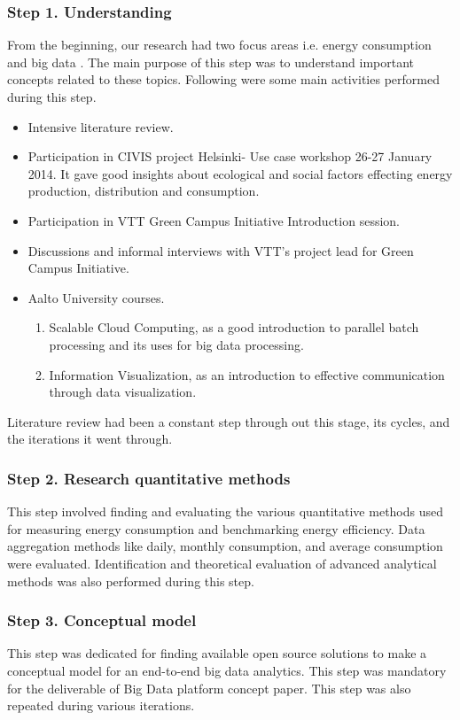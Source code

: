 \subsubsection{Step 1. Understanding} 
From the beginning, our research had two focus areas i.e. energy consumption and big data . The main purpose of this step was to understand important concepts related to these topics. Following were some main activities performed during this step.
\begin{itemize}
\item Intensive literature review.
\item Participation in CIVIS project Helsinki- Use case workshop 26-27 January 2014. It gave good insights about ecological and social factors effecting energy production, distribution and consumption.
\item Participation in VTT Green Campus Initiative Introduction session.
\item Discussions and informal interviews with VTT's project lead for Green Campus Initiative.
\item Aalto University courses.
	\begin{enumerate}
	    \item Scalable Cloud Computing, as a good introduction to parallel batch processing and its uses for big data processing.
	    \item Information Visualization, as an introduction to effective communication through data visualization.
	  \end{enumerate}      
\end{itemize}

Literature review had been a constant step through out this stage, its cycles, and the iterations it went through.
\subsubsection{Step 2. Research quantitative methods} \label{qm}
This step involved finding and evaluating the various quantitative methods used for measuring energy consumption and benchmarking energy efficiency. Data aggregation methods like daily, monthly consumption, and average consumption were evaluated. Identification and theoretical evaluation of advanced analytical methods was also performed during this step.
\subsubsection{Step 3. Conceptual model}\label{cmodel}
This step was dedicated for finding available open source solutions to make a conceptual model for an end-to-end big data analytics. This step was mandatory for the deliverable of Big Data platform concept paper. This step was also repeated during various iterations.

